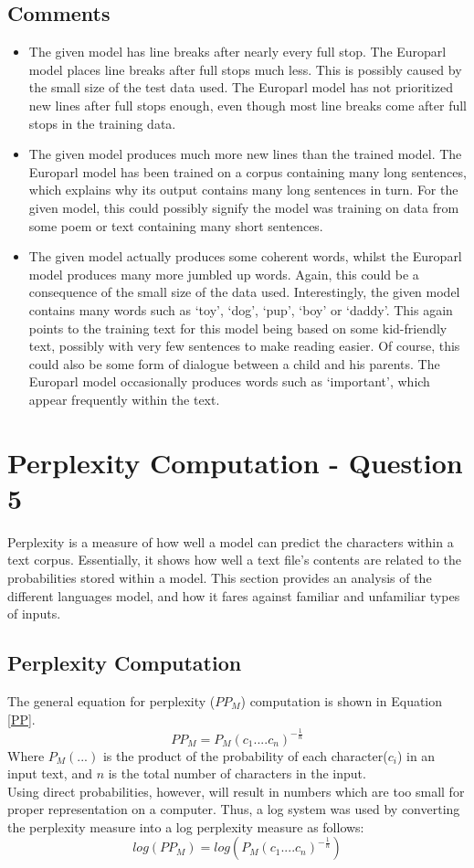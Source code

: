 \documentclass[12pt]{article}
\begin{document}
\subsection{Comments}
\begin{itemize}
	\item  The given model has line breaks after nearly every full stop.  The Europarl model places line breaks after full stops much less.  This  is possibly caused by the small size of the test data used.  The Europarl model has not prioritized new lines after full stops enough, even though most line breaks come after full stops in the training data. 
	\item  The given model produces much more new lines than the trained model.  The Europarl model has been trained on a corpus containing many long sentences, which explains why its output contains many long sentences in turn.  For the given model, this could possibly signify the model was training on data from some poem or text containing many short sentences.
	\item The given model actually produces some coherent words, whilst the Europarl model produces many more jumbled up words.  Again, this could be a consequence of the small size of the data used.  Interestingly, the given model contains many words such as `toy', `dog', `pup', `boy' or `daddy'.  This again points to the training text for this model being based on some kid-friendly text, possibly with very few sentences to make reading easier.  Of course, this could also be some form of dialogue between a child and his parents.  The Europarl model occasionally produces words such as `important', which appear frequently within the text.
	\newpage
\end{itemize}
\section{Perplexity Computation - Question 5}
\label{S5}
Perplexity is a measure of how well a model can predict the characters within a text corpus.  Essentially, it shows how well a text file's contents are related to the probabilities stored within a model.  This section provides an analysis of the different languages model, and how it fares against familiar and unfamiliar types of inputs.
\subsection{Perplexity Computation}
The general equation for perplexity ($PP_{M}$) computation is shown in Equation \ref{PP}.
\begin{equation}\label{PP}
	PP_{M} = P_{M}\left( c_{1}.... c_{n}\right)^{-\frac{1}{n}}
\end{equation}
Where $P_{M}(...)$ is the product of the probability of each character($c_{i}$) in an input text, and $n$ is the total number of characters in the input.\\
\hfill\break
 Using direct probabilities, however, will result in numbers which are too small for proper representation on a computer.  Thus, a log system was used by converting the perplexity measure into a log perplexity measure as follows:
\[log\left(PP_{M}\right) = log\left(P_{M}\left( c_{1}.... c_{n}\right)^{-\frac{1}{n}}\right)\]
\end{document}
